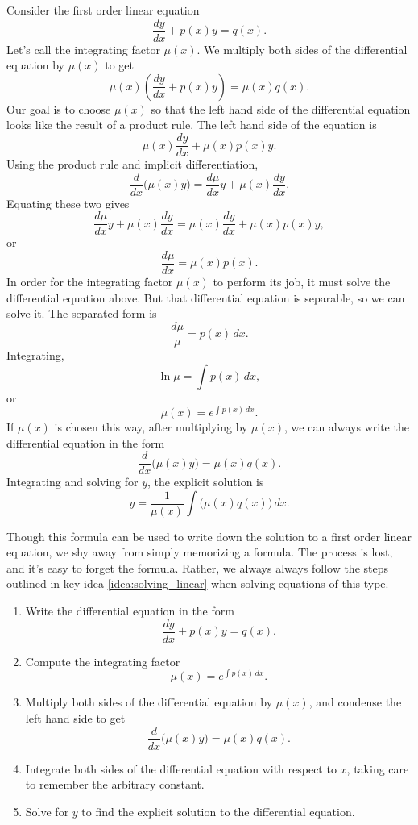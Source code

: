 Consider the first order linear equation
	\[
		\frac{dy}{dx} + p(x)y = q(x).
	\]
Let's call the integrating factor $\mu(x)$.  We multiply both sides of the differential equation by $\mu(x)$ to get
	\[
		\mu(x) \left ( \frac{dy}{dx} + p(x)y \right ) = \mu(x)q(x).
	\]
Our goal is to choose $\mu(x)$ so that the left hand side of the differential equation looks like the result of a product rule.  The left hand side of the equation is
	\[
		\mu(x) \frac{dy}{dx} + \mu(x)p(x)y.
	\]
Using the product rule and implicit differentiation,
	\[
		\frac{d}{dx} \big ( \mu(x) y \big ) = \frac{d\mu}{dx}y + \mu(x)\frac{dy}{dx}.
	\]
Equating these two gives
	\[
		\frac{d\mu}{dx}y + \mu(x)\frac{dy}{dx} = \mu(x) \frac{dy}{dx} + \mu(x)p(x)y,
	\]
or
	\[
		\frac{d\mu}{dx} = \mu(x)p(x).	
	\]
In order for the integrating factor $\mu(x)$ to perform its job, it must solve the differential equation above.  But that differential equation is separable, so we can solve it.  The separated form is
	\[
		\frac{d\mu}{\mu} = p(x)\,dx.
	\]
Integrating,
	\[
		\ln \mu = \int p(x)\,dx,
	\]
or
	\[
		\mu(x) = e^{\int p(x)\,dx}.
	\]
If $\mu(x)$ is chosen this way, after multiplying by $\mu(x)$, we can always write the differential equation in the form
	\[
		\frac{d}{dx} \big( \mu(x)y \big) = \mu(x)q(x).
	\]
Integrating and solving for $y$, the explicit solution is
	\[
		y = \frac{1}{\mu(x)}\int \big( \mu(x)q(x) \big)\,dx.
	\]
	

Though this formula can be used to write down the solution to a first order linear equation, we shy away from simply memorizing a formula. The process is lost, and it's easy to forget the formula. Rather, we always always follow the steps outlined in key idea \ref{idea:solving_linear} when solving equations of this type.

{
\begin{enumerate}
	\item Write the differential equation in the form
		\[
			\frac{dy}{dx} + p(x)y = q(x).
		\]
	\item Compute the integrating factor
		\[
			\mu(x) = e^{\int p(x)\,dx}.
		\]
	\item Multiply both sides of the differential equation by $\mu(x)$, and condense the left hand side to get
		\[
			\frac{d}{dx}\big( \mu(x)y \big) = \mu(x)q(x).
		\]
	\item Integrate both sides of the differential equation with respect to $x$, taking care to remember the arbitrary constant.
	\item Solve for $y$ to find the explicit solution to the differential equation.
\end{enumerate}
}

